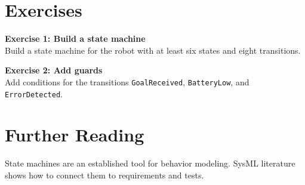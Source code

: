 \section{Exercises}
\begin{uebungbox}
\textbf{Exercise 1: Build a state machine}\\
Build a state machine for the robot with at least six states and eight transitions.
\end{uebungbox}

\begin{uebungbox}
\textbf{Exercise 2: Add guards}\\
Add conditions for the transitions \texttt{GoalReceived}, \texttt{BatteryLow}, and \texttt{ErrorDetected}.
\end{uebungbox}

\section{Further Reading}
State machines are an established tool for behavior modeling. SysML literature \cite{delligatti2014,friedenthal2014} shows how to connect them to requirements and tests.
